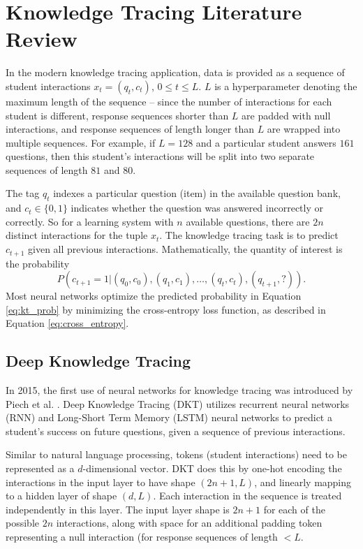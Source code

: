 \section{Knowledge Tracing Literature Review}\label{sec:kt_lit}
In the modern knowledge tracing application, data is provided as a sequence of student interactions $x_t = (q_t, c_t)$, $0 \leq t \leq L$. $L$ is a hyperparameter denoting the maximum length of the sequence -- since the number of interactions for each student is different, response sequences shorter than $L$ are padded with null interactions, and response sequences of length longer than $L$ are wrapped into multiple sequences. For example, if $L=128$ and a particular student answers $161$ questions, then this student's interactions will be split into two separate sequences of length $81$ and $80$.

The tag $q_t$ indexes a particular question (item) in the available question bank, and $c_t \in\{0,1\}$ indicates whether the question was answered incorrectly or correctly. So for a learning system with $n$ available questions, there are $2n$ distinct interactions for the tuple $x_t$. The knowledge tracing task is to predict $c_{t+1}$ given all previous interactions. Mathematically, the quantity of interest is the probability 
\begin{equation}
  P(c_{t+1} = 1 | (q_0,c_0), (q_1,c_1),\ldots,(q_t, c_t), (q_{t+1}, ?)).
  \label{eq:kt_prob}
\end{equation}
Most neural networks optimize the predicted probability in Equation \ref{eq:kt_prob} by  minimizing the cross-entropy loss function, as described in Equation \ref{eq:cross_entropy}.

\subsection{Deep Knowledge Tracing}
In 2015, the first use of neural networks for knowledge tracing was introduced by Piech et al. \cite{piech2015}. Deep Knowledge Tracing (DKT) utilizes recurrent neural networks (RNN) and Long-Short Term Memory (LSTM) neural networks to predict a student's success on future questions, given a sequence of previous interactions. 

Similar to natural language processing, tokens (student interactions) need to be represented as a $d$-dimensional vector. DKT does this by one-hot encoding the interactions in the input layer to have shape $(2n+1, L)$,  and linearly mapping to a hidden layer of shape $(d, L)$. Each interaction in the sequence is treated independently in this layer. The input layer shape is $2n+1$ for each of the possible $2n$ interactions, along with space for an additional padding token representing a null interaction (for response sequences of length $< L$.

